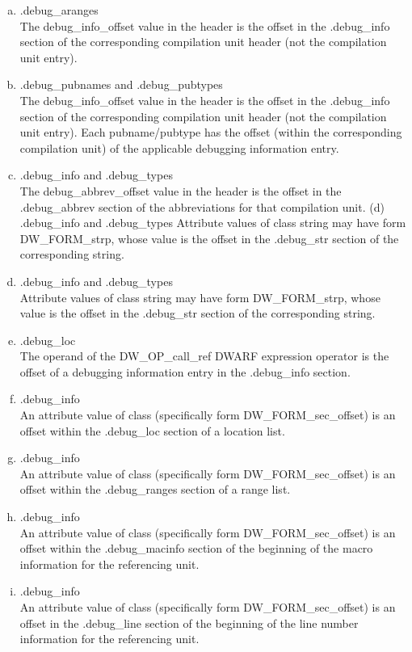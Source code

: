 \clearpage
\begin{enumerate}[(a)]  
\item  .debug\_aranges  \\
The debug\_info\_offset value in
the header is the offset in the .debug\_info section of the
corresponding compilation unit header (not the compilation
unit entry).

\item .debug\_pubnames and .debug\_pubtypes \\
The debug\_info\_offset value in the header is the offset in the
.debug\_info section of the corresponding compilation unit header (not
the compilation unit entry). Each pubname/pubtype has the offset (within
the corresponding compilation unit) of the applicable debugging
information entry.

\item .debug\_info and .debug\_types \\
The debug\_abbrev\_offset value in the header is the offset in the
.debug\_abbrev section of the abbreviations for that compilation unit.
(d) .debug\_info and .debug\_types
Attribute values of class string may have form DW\_FORM\_strp, whose
value is the offset in the .debug\_str section of the corresponding string.

\item  .debug\_info and .debug\_types \\
Attribute values of class string may have form DW\_FORM\_strp, whose
value is the offset in the .debug\_str section of the corresponding string.

\item .debug\_loc \\
The operand of the DW\_OP\_call\_ref DWARF expression operator is the
offset of a debugging information entry in the .debug\_info section.

\item .debug\_info \\
An attribute value of class  (specifically form
DW\_FORM\_sec\_offset) is an offset within the .debug\_loc section of a
location list.

\item .debug\_info \\
An attribute value of class  (specifically form
DW\_FORM\_sec\_offset) is an offset within the .debug\_ranges section of
a range list.


\item .debug\_info \\
An attribute value of class  (specifically form
DW\_FORM\_sec\_offset) is an offset within the .debug\_macinfo section
of the beginning of the macro information for the referencing unit.


\item .debug\_info \\
An attribute value of class  (specifically form
DW\_FORM\_sec\_offset) is an offset in the .debug\_line section of the
beginning of the line number information for the referencing unit.
\end{enumerate}



